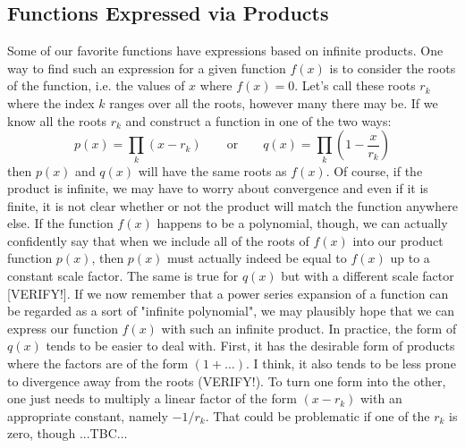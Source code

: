 









\subsection{Functions Expressed via Products}
Some of our favorite functions have expressions based on infinite products. One way to find such an expression for a given function $f(x)$ is to consider the roots of the function, i.e. the values of $x$ where $f(x) = 0$. Let's call these roots $r_k$ where the index $k$ ranges over all the roots, however many there may be. If we know all the roots $r_k$ and construct a function in one of the two ways:
\begin{equation}
 p(x) = \prod_{k} (x - r_k)  \qquad \text{or} \qquad
 q(x) = \prod_{k} (1 - \frac{x}{r_k})
\end{equation}
then $p(x)$ and $q(x)$ will have the same roots as $f(x)$. Of course, if the product is infinite, we may have to worry about convergence and even if it is finite, it is not clear whether or not the product will match the function anywhere else. If the function $f(x)$ happens to be a polynomial, though, we can actually confidently say that when we include all of the roots of $f(x)$ into our product function $p(x)$, then $p(x)$ must actually indeed be equal to $f(x)$ up to a constant scale factor. The same is true for $q(x)$ but with a different scale factor [VERIFY!]. If we now remember that a power series expansion of a function can be regarded as a sort of "infinite polynomial", we may plausibly hope that we can express our function $f(x)$ with such an infinite product. In practice, the form of $q(x)$ tends to be easier to deal with. First, it has the desirable form of products where the factors are of the form $(1 + \ldots)$. I think, it also tends to be less prone to divergence away from the roots (VERIFY!). To turn one form into the other, one just needs to multiply a linear factor of the form $(x - r_k)$ with an appropriate constant, namely $-1 / r_k$. That could be problematic if one of the $r_k$ is zero, though ...TBC...

